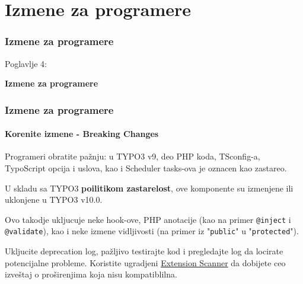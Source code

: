 %

\section{Izmene za programere}
\begin{frame}[fragile]
	\frametitle{Izmene za programere}

	\begin{center}\huge{Poglavlje 4:}\end{center}
	\begin{center}\huge{\color{typo3darkgrey}\textbf{Izmene za programere}}\end{center}

\end{frame}



\begin{frame}[fragile]
	\frametitle{Izmene za programere}
	\framesubtitle{Korenite izmene - Breaking Changes}

	\small
		Programeri obratite pažnju: u TYPO3 v9, deo PHP koda, TSconfig-a, TypoScript
        opcija i uslova, kao i Scheduler tasks-ova je oznacen kao zastareo.

		\vspace{0.2cm}

		U skladu sa TYPO3 \textbf{poilitikom zastarelost}, ove komponente su izmenjene ili
		uklonjene u TYPO3 v10.0.

		\vspace{0.2cm}

		Ovo takodje ukljucuje neke hook-ove, PHP anotacije (kao na primer \texttt{@inject} i
		\texttt{@validate}), kao i neke izmene vidljivosti (na primer iz
		"\texttt{public}" u "\texttt{protected}").

		\vspace{0.2cm}

		Ukljucite deprecation log, pažljivo testirajte kod i pregledajte log da locirate
		potencijalne probleme. Koristite ugradjeni
		\href{https://docs.typo3.org/m/typo3/reference-coreapi/master/en-us/ApiOverview/ExtensionScanner/Index.html}{Extension Scanner}
		da dobijete ceo izveštaj o proširenjima koja nisu kompatiblilna.

	\normalsize

\end{frame}

